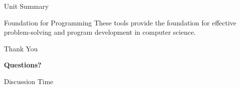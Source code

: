 \documentclass[aspectratio=169]{beamer}
\begin{document}
\begin{frame}{Unit Summary}
    \vspace{0.3cm}
    \begin{block}{Foundation for Programming}
        These tools provide the foundation for effective problem-solving and program development in computer science.
    \end{block}
\end{frame}

\begin{frame}{Thank You}
    \begin{center}
        \Huge{\textbf{Questions?}}
        
        \vspace{1cm}
        \Large{ Discussion Time}
    \end{center}
\end{frame}
\end{document}
